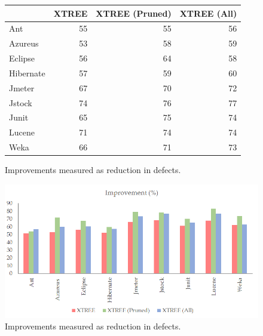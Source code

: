 \begin{figure}[htbp]
\centering
\begin{tabular}{l|r|r|r}
& \multicolumn{1}{l|}{XTREE} & \multicolumn{1}{l|}{XTREE (Pruned)} & 
\multicolumn{1}{l}{XTREE (All)} \\\hline
    Ant   & 55    & 55    & 56 \\
Azureus  & 53    & 58    & 59 \\
Eclipse & 56    & 64    & 58 \\
Hibernate & 57    & 59    & 60 \\
Jmeter & 67    & 70    & 72 \\
Jstock & 74    & 76    & 77 \\
Junit & 65    & 75    & 74 \\
Lucene & 71    & 74    & 74 \\
Weka  & 66    & 71    & 73 \\
\hline
\end{tabular}
\caption{Improvements measured as reduction in defects.}
\label{fig:rq2-1}
\end{figure}

\begin{figure}[t]
	\centering
	\includegraphics[width=\linewidth]{rq2.png}
	\caption{Improvements measured as reduction in defects.}
	\label{fig:rq2-2}
\end{figure}